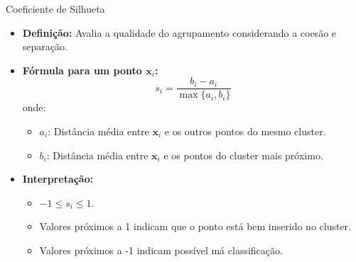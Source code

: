\documentclass{beamer}
\begin{document}
\begin{frame}{Coeficiente de Silhueta}
    \begin{itemize}
        \item \textbf{Definição:} Avalia a qualidade do agrupamento considerando a coesão e separação.
        \item \textbf{Fórmula para um ponto \( \mathbf{x}_i \):}
        \[
        s_i = \frac{b_i - a_i}{\max\{a_i, b_i\}}
        \]
        onde:
        \begin{itemize}
            \item \( a_i \): Distância média entre \( \mathbf{x}_i \) e os outros pontos do mesmo cluster.
            \item \( b_i \): Distância média entre \( \mathbf{x}_i \) e os pontos do cluster mais próximo.
        \end{itemize}
        \item \textbf{Interpretação:}
        \begin{itemize}
            \item \( -1 \leq s_i \leq 1 \).
            \item Valores próximos a 1 indicam que o ponto está bem inserido no cluster.
            \item Valores próximos a -1 indicam possível má classificação.
        \end{itemize}
    \end{itemize}
\end{frame}
\end{document}
